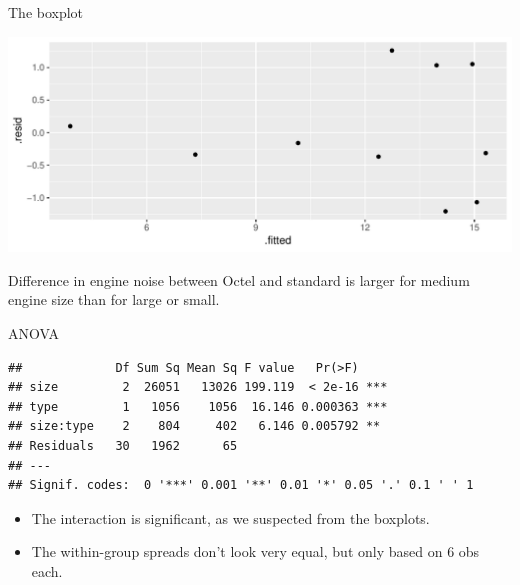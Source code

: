 \begin{frame}[fragile]{The boxplot}
\begin{knitrout}
\color{fgcolor}\begin{kframe}
\begin{alltt}
\end{alltt}
\end{kframe}
\includegraphics[width=\maxwidth]{figure/unnamed-chunk-19-1} 

\end{knitrout}

Difference in engine noise between Octel and standard is larger for
medium engine size than for large or small.
\end{frame}


\begin{frame}[fragile]{ANOVA}
  
\begin{knitrout}
\color{fgcolor}\begin{kframe}
\begin{alltt}
\hlkwb{=}\hlopt{~}\hlopt{*}
\end{alltt}
\begin{verbatim}
##             Df Sum Sq Mean Sq F value   Pr(>F)    
## size         2  26051   13026 199.119  < 2e-16 ***
## type         1   1056    1056  16.146 0.000363 ***
## size:type    2    804     402   6.146 0.005792 ** 
## Residuals   30   1962      65                     
## ---
## Signif. codes:  0 '***' 0.001 '**' 0.01 '*' 0.05 '.' 0.1 ' ' 1
\end{verbatim}
\end{kframe}
\end{knitrout}

\begin{itemize}
\item The interaction is significant, as we suspected from the boxplots.
\item The within-group spreads don't look very equal, but only based
  on 6 obs each.
\end{itemize}
  
\end{frame}

